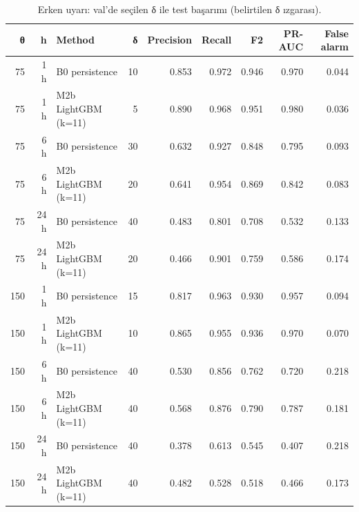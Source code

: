\begin{table}[t]
\caption{Erken uyarı: val'de seçilen δ ile test başarımı (belirtilen δ ızgarası).}
\label{tab:rq2_warning}
\centering\footnotesize
\begin{tabular}{rrlrrrrrr}
\toprule
θ & h & Method & δ & Precision & Recall & F2 & PR-AUC & False alarm \\
\midrule
75 & 1 h & B0 persistence & 10 & 0.853 & 0.972 & 0.946 & 0.970 & 0.044 \\
75 & 1 h & M2b LightGBM (k=11) & 5 & 0.890 & 0.968 & 0.951 & 0.980 & 0.036 \\
75 & 6 h & B0 persistence & 30 & 0.632 & 0.927 & 0.848 & 0.795 & 0.093 \\
75 & 6 h & M2b LightGBM (k=11) & 20 & 0.641 & 0.954 & 0.869 & 0.842 & 0.083 \\
75 & 24 h & B0 persistence & 40 & 0.483 & 0.801 & 0.708 & 0.532 & 0.133 \\
75 & 24 h & M2b LightGBM (k=11) & 20 & 0.466 & 0.901 & 0.759 & 0.586 & 0.174 \\
150 & 1 h & B0 persistence & 15 & 0.817 & 0.963 & 0.930 & 0.957 & 0.094 \\
150 & 1 h & M2b LightGBM (k=11) & 10 & 0.865 & 0.955 & 0.936 & 0.970 & 0.070 \\
150 & 6 h & B0 persistence & 40 & 0.530 & 0.856 & 0.762 & 0.720 & 0.218 \\
150 & 6 h & M2b LightGBM (k=11) & 40 & 0.568 & 0.876 & 0.790 & 0.787 & 0.181 \\
150 & 24 h & B0 persistence & 40 & 0.378 & 0.613 & 0.545 & 0.407 & 0.218 \\
150 & 24 h & M2b LightGBM (k=11) & 40 & 0.482 & 0.528 & 0.518 & 0.466 & 0.173 \\
\bottomrule
\end{tabular}
\end{table}

